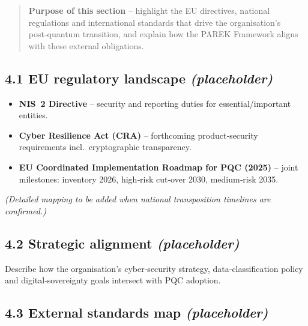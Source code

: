 \documentclass[
  english,
]{article}
\providecommand{\tightlist}{%
  \setlength{\itemsep}{0pt}\setlength{\parskip}{0pt}}
\begin{document}
\begin{quote}
\textbf{Purpose of this section} -- highlight the EU directives,
national regulations and international standards that drive the
organisation's post‑quantum transition, and explain how the PAREK
Framework aligns with these external obligations.
\end{quote}

\subsection{\texorpdfstring{4.1 EU regulatory landscape
\emph{(placeholder)}}{4.1 EU regulatory landscape (placeholder)}}\label{eu-regulatory-landscape-placeholder}

\begin{itemize}
\tightlist
\item
  \textbf{NIS~2 Directive} -- security and reporting duties for
  essential/important entities.\\
\item
  \textbf{Cyber Resilience Act (CRA)} -- forthcoming product‑security
  requirements incl.~cryptographic transparency.\\
\item
  \textbf{EU Coordinated Implementation Roadmap for PQC (2025)} -- joint
  milestones: inventory 2026, high‑risk cut‑over 2030, medium‑risk 2035.
\end{itemize}

\emph{(Detailed mapping to be added when national transposition
timelines are confirmed.)}

\subsection{\texorpdfstring{4.2 Strategic alignment
\emph{(placeholder)}}{4.2 Strategic alignment (placeholder)}}\label{strategic-alignment-placeholder}

Describe how the organisation's cyber‑security strategy,
data‑classification policy and digital‑sovereignty goals intersect with
PQC adoption.

\subsection{\texorpdfstring{4.3 External standards map
\emph{(placeholder)}}{4.3 External standards map (placeholder)}}\label{external-standards-map-placeholder}
\end{document}
